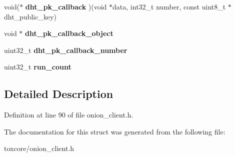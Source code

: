 \begin{DoxyCompactItemize}
\item 
\hypertarget{struct_onion___friend_ab0f780a41ece58bf84d8460e71cbdbb3}{void($\ast$ {\bfseries dht\+\_\+pk\+\_\+callback} )(void $\ast$data, int32\+\_\+t number, const uint8\+\_\+t $\ast$dht\+\_\+public\+\_\+key)}\label{struct_onion___friend_ab0f780a41ece58bf84d8460e71cbdbb3}

\item 
\hypertarget{struct_onion___friend_ab5d618d73b8d83fb07209433e7b448ee}{void $\ast$ {\bfseries dht\+\_\+pk\+\_\+callback\+\_\+object}}\label{struct_onion___friend_ab5d618d73b8d83fb07209433e7b448ee}

\item 
\hypertarget{struct_onion___friend_ab0413da421baacf312141b8ae3ec7762}{uint32\+\_\+t {\bfseries dht\+\_\+pk\+\_\+callback\+\_\+number}}\label{struct_onion___friend_ab0413da421baacf312141b8ae3ec7762}

\item 
\hypertarget{struct_onion___friend_a9b6e91b90249c9b72d98611ba5ed7176}{uint32\+\_\+t {\bfseries run\+\_\+count}}\label{struct_onion___friend_a9b6e91b90249c9b72d98611ba5ed7176}

\end{DoxyCompactItemize}


\subsection{Detailed Description}


Definition at line 90 of file onion\+\_\+client.\+h.



The documentation for this struct was generated from the following file\+:\begin{DoxyCompactItemize}
\item 
toxcore/onion\+\_\+client.\+h\end{DoxyCompactItemize}
